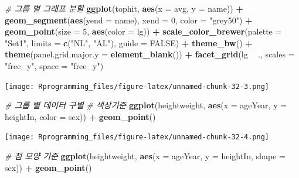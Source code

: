 \documentclass[10pt,]{krantz}
\makeatletter
\newenvironment{Shaded}{\begin{snugshade}}{\end{snugshade}}
\newcommand{\KeywordTok}[1]{\textcolor[rgb]{0.13,0.29,0.53}{\textbf{#1}}}
\newcommand{\DataTypeTok}[1]{\textcolor[rgb]{0.13,0.29,0.53}{#1}}
\newcommand{\DecValTok}[1]{\textcolor[rgb]{0.00,0.00,0.81}{#1}}
\newcommand{\StringTok}[1]{\textcolor[rgb]{0.31,0.60,0.02}{#1}}
\newcommand{\CommentTok}[1]{\textcolor[rgb]{0.56,0.35,0.01}{\textit{#1}}}
\newcommand{\OtherTok}[1]{\textcolor[rgb]{0.56,0.35,0.01}{#1}}
\newcommand{\OperatorTok}[1]{\textcolor[rgb]{0.81,0.36,0.00}{\textbf{#1}}}
\newcommand{\NormalTok}[1]{#1}
\newenvironment{kframe}{%
\medskip{}
\setlength{\fboxsep}{.8em}
 \def\at@end@of@kframe{}%
 \ifinner\ifhmode%
  \def\at@end@of@kframe{\end{minipage}}%
  \begin{minipage}{\columnwidth}%
 \fi\fi%
 \def\FrameCommand##1{\hskip\@totalleftmargin \hskip-\fboxsep
 \colorbox{shadecolor}{##1}\hskip-\fboxsep
     \hskip-\linewidth \hskip-\@totalleftmargin \hskip\columnwidth}%
 \MakeFramed {\advance\hsize-\width
   \@totalleftmargin\z@ \linewidth\hsize
   \@setminipage}}%
 {\par\unskip\endMakeFramed%
 \at@end@of@kframe}
\renewenvironment{Shaded}{\begin{kframe}}{\end{kframe}}
\theoremstyle{definition}
\theoremstyle{definition}
\theoremstyle{remark}
\makeatother
\begin{document}
\begin{Shaded}
\begin{Highlighting}[]


\CommentTok{# 그룹 별 그래프 분할 }
\KeywordTok{ggplot}\NormalTok{(tophit, }\KeywordTok{aes}\NormalTok{(}\DataTypeTok{x =}\NormalTok{ avg, }\DataTypeTok{y =}\NormalTok{ name)) }\OperatorTok{+}\StringTok{ }
\StringTok{  }\KeywordTok{geom_segment}\NormalTok{(}\KeywordTok{aes}\NormalTok{(}\DataTypeTok{yend =}\NormalTok{ name), }\DataTypeTok{xend =} \DecValTok{0}\NormalTok{, }\DataTypeTok{color =} \StringTok{"grey50"}\NormalTok{) }\OperatorTok{+}\StringTok{ }\KeywordTok{geom_point}\NormalTok{(}\DataTypeTok{size =} \DecValTok{5}\NormalTok{, }\KeywordTok{aes}\NormalTok{(}\DataTypeTok{color =}\NormalTok{ lg)) }\OperatorTok{+}\StringTok{ }
\StringTok{  }\KeywordTok{scale_color_brewer}\NormalTok{(}\DataTypeTok{palette =} \StringTok{"Set1"}\NormalTok{, }\DataTypeTok{limits =} \KeywordTok{c}\NormalTok{(}\StringTok{"NL"}\NormalTok{, }\StringTok{"AL"}\NormalTok{), }\DataTypeTok{guide =} \OtherTok{FALSE}\NormalTok{) }\OperatorTok{+}\StringTok{ }\KeywordTok{theme_bw}\NormalTok{() }\OperatorTok{+}\StringTok{ }
\StringTok{  }\KeywordTok{theme}\NormalTok{(}\DataTypeTok{panel.grid.major.y =} \KeywordTok{element_blank}\NormalTok{()) }\OperatorTok{+}\StringTok{ }\KeywordTok{facet_grid}\NormalTok{(lg }\OperatorTok{~}\StringTok{ }\NormalTok{., }\DataTypeTok{scales =} \StringTok{"free_y"}\NormalTok{, }\DataTypeTok{space =} \StringTok{"free_y"}\NormalTok{) }
\end{Highlighting}
\end{Shaded}

\texttt{[image: Rprogramming\_files/figure-latex/unnamed-chunk-32-3.png]}

\begin{Shaded}
\begin{Highlighting}[]


\CommentTok{# 그룹 별 데이터 구별}
\CommentTok{# 색상기준}
\KeywordTok{ggplot}\NormalTok{(heightweight, }\KeywordTok{aes}\NormalTok{(}\DataTypeTok{x =}\NormalTok{ ageYear, }\DataTypeTok{y =}\NormalTok{ heightIn, }\DataTypeTok{color =}\NormalTok{ sex)) }\OperatorTok{+}\StringTok{ }\KeywordTok{geom_point}\NormalTok{()}
\end{Highlighting}
\end{Shaded}

\texttt{[image: Rprogramming\_files/figure-latex/unnamed-chunk-32-4.png]}

\begin{Shaded}
\begin{Highlighting}[]


\CommentTok{# 점 모양 기준}
\KeywordTok{ggplot}\NormalTok{(heightweight, }\KeywordTok{aes}\NormalTok{(}\DataTypeTok{x =}\NormalTok{ ageYear, }\DataTypeTok{y =}\NormalTok{ heightIn, }\DataTypeTok{shape =}\NormalTok{ sex)) }\OperatorTok{+}\StringTok{ }\KeywordTok{geom_point}\NormalTok{()}
\end{Highlighting}
\end{Shaded}
\end{document}
